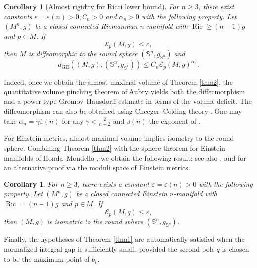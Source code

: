 \documentclass[11pt]{amsart}
\theoremstyle{plain}
\newtheorem{corollary}[theorem]{Corollary}
\numberwithin{equation}{section}
\renewcommand{\S}{\mathbb{S}}
\newcommand{\ve}{\varepsilon}
\newcommand{\E}{\mathcal{E}}
\DeclareMathOperator{\ric}{Ric}
\begin{document}
\begin{corollary}[Almost rigidity for Ricci lower bound]\label{cor3}
For $n\ge 3$, there exist constants $\ve=\ve(n)>0,C_n>0$ and $\alpha_n>0$ with the following property. Let $(M^n,g)$ be a closed connected Riemannian $n$-manifold with $\ric\ge(n-1)g$ and $p\in M$. If 
\begin{equation*}
\E_p(M,g)\le \ve,
\end{equation*}
then $M$ is diffeomorphic to the round sphere $(\S^n,g_{\S^n})$ and
\begin{equation*}
d_{\mathrm{GH}}((M,g),(\S^n,g_{\S^n}))\le C_n\E_p(M,g)^{\alpha_n}.
\end{equation*}
\end{corollary}

Indeed, once we obtain the almost-maximal volume of Theorem \ref{thm2}, the quantitative volume pinching theorem of Aubry \cite[Theorem 4]{Aubry2005} yields both the diffeomorphism and a power-type Gromov--Hausdorff estimate in terms of the volume deficit. The diffeomorphism can also be obtained using Cheeger--Colding theory \cite{CheegerColding1997}. One may take $\alpha_n=\gamma\beta(n)$ for any $\gamma<\frac{2}{n+2}$ and $\beta(n)$ the exponent of \cite{Aubry2005}.


For Einstein metrics, almost-maximal volume implies isometry to the round sphere. Combining Theorem \ref{thm2} with the sphere theorem for Einstein manifolds of Honda--Mondello \cite[Theorem C]{HondaMondello}, we obtain the following result; see also \cite[Theorem 3.12]{HondaMondino}, and \cite[Chapter 12]{Besse} for an alternative proof via the moduli space of Einstein metrics.

\begin{corollary}\label{thm3}
For $n\ge 3$, there exists a constant $\ve=\ve(n)>0$ with the following property. Let $(M^n,g)$ be a closed connected Einstein $n$-manifold with $\ric=(n-1)g$ and $p\in M$. If
\begin{equation*}
\E_p(M,g)\le \ve,
\end{equation*}
then $(M,g)$ is isometric to the round sphere $(\S^n,g_{\S^n})$.
\end{corollary}

Finally, the hypotheses of Theorem \ref{thm1} are automatically satisfied when the normalized integral gap is sufficiently small, provided the second pole $q$ is chosen to be the maximum point of $b_p$.
\end{document}
